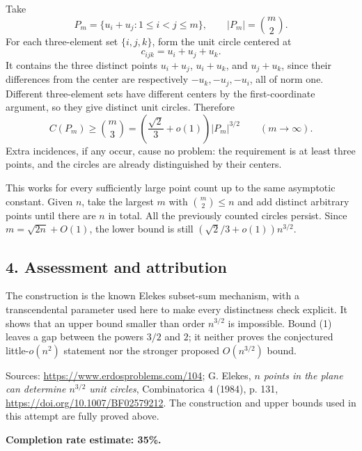 Take
\[
 P_m=\{u_i+u_j:1\le i<j\le m\},\qquad |P_m|=\binom m2.
\]
For each three-element set $\{i,j,k\}$, form the unit circle centered at
\[
 c_{ijk}=u_i+u_j+u_k.
\]
It contains the three distinct points $u_i+u_j$, $u_i+u_k$, and $u_j+u_k$, since their differences from the center are respectively $-u_k,-u_j,-u_i$, all of norm one. Different three-element sets have different centers by the first-coordinate argument, so they give distinct unit circles. Therefore
\[
 C(P_m)\ge\binom m3
 =\left(\frac{\sqrt2}{3}+o(1)\right)|P_m|^{3/2}
 \qquad(m\to\infty).\tag{3}
\]
Extra incidences, if any occur, cause no problem: the requirement is at least three points, and the circles are already distinguished by their centers.

This works for every sufficiently large point count up to the same asymptotic constant. Given $n$, take the largest $m$ with $\binom m2\le n$ and add distinct arbitrary points until there are $n$ in total. All the previously counted circles persist. Since $m=\sqrt{2n}+O(1)$, the lower bound is still $(\sqrt2/3+o(1))n^{3/2}$.

\subsection*{4. Assessment and attribution}
The construction is the known Elekes subset-sum mechanism, with a transcendental parameter used here to make every distinctness check explicit. It shows that an upper bound smaller than order $n^{3/2}$ is impossible. Bound (1) leaves a gap between the powers $3/2$ and $2$; it neither proves the conjectured little-$o(n^2)$ statement nor the stronger proposed $O(n^{3/2})$ bound.

Sources: \url{https://www.erdosproblems.com/104}; G. Elekes, \emph{$n$ points in the plane can determine $n^{3/2}$ unit circles}, Combinatorica 4 (1984), p. 131, \url{https://doi.org/10.1007/BF02579212}. The construction and upper bounds used in this attempt are fully proved above.

\textbf{Completion rate estimate: 35\%.}

